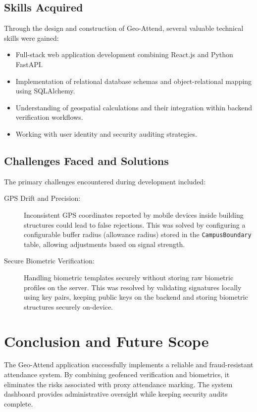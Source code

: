\documentclass[12pt]{report}
\begin{document}
{\section{Skills Acquired}
Through the design and construction of Geo-Attend, several valuable technical skills were gained:
\begin{itemize}
    \item Full-stack web application development combining React.js and Python FastAPI.
    \item Implementation of relational database schemas and object-relational mapping using SQLAlchemy.
    \item Understanding of geospatial calculations and their integration within backend verification workflows.
    \item Working with user identity and security auditing strategies.
\end{itemize}

\section{Challenges Faced and Solutions}
The primary challenges encountered during development included:
\begin{description}
    \item[GPS Drift and Precision:] Inconsistent GPS coordinates reported by mobile devices inside building structures could lead to false rejections. This was solved by configuring a configurable buffer radius (allowance radius) stored in the \texttt{CampusBoundary} table, allowing adjustments based on signal strength.
    \item[Secure Biometric Verification:] Handling biometric templates securely without storing raw biometric profiles on the server. This was resolved by validating signatures locally using key pairs, keeping public keys on the backend and storing biometric structures securely on-device.
\end{description}


\chapter{Conclusion and Future Scope}
The Geo-Attend application successfully implements a reliable and fraud-resistant attendance system. By combining geofenced verification and biometrics, it eliminates the risks associated with proxy attendance marking. The system dashboard provides administrative oversight while keeping security audits complete.

}
\end{document}
